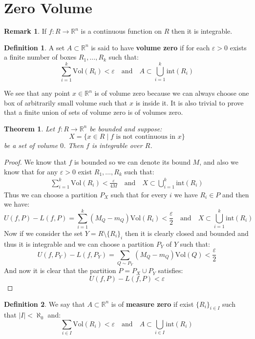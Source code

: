 \documentclass[11pt,a4paper]{article}
\theoremstyle{definition}
\newtheorem{definition}{Definition}[section]
\newtheorem{remark}{Remark}[section]
\theoremstyle{plain}
\newtheorem{theorem}{Theorem}[section]
\newcommand{\R}{\mathbb{R}}
\begin{document}
	\newpage
	
	\section{Zero Volume}
	\begin{remark}
		If $f \colon R \to \R^n$ is a continuous function on $R$
		then it is integrable.
	\end{remark}
	\begin{definition}
		A set $A \subset \R^n$ is said to have \textbf{volume zero}
		if for each $\varepsilon > 0$ exists a finite number of
		boxes $R_1,\dots,R_k$ such that:
		\[
			\sum_{i=1}^{k}{\mathrm{Vol}(R_i)} < \varepsilon
			\quad \text{and} \quad
			A \subset \bigcup_{i=1}^{k}{\text{int}(R_i)}
		\]
	\end{definition}
	We see that any point $x \in \R^n$ is of volume zero because
	we can always choose one box of arbitrarily small volume such that
	$x$ is inside it. It is also trivial to prove that a finite
	union of sets of volume zero is of volumes zero.
	\begin{theorem}
		Let $f \colon R \to \R^n$ be bounded and suppose:
		\[
			X = \{x \in R \mid \text{$f$ is not continuous in $x$}\}
		\]
		be a set of volume $0$. Then $f$ is integrable over $R$.
	\end{theorem}
	\begin{proof}
		We know that $f$ is bounded so we can denote its bound $M$,
		and also we know that for any $\varepsilon > 0 $ exist
		$R_1,\dots,R_k$ such that:
		\begin{align*}
			\sum_{i=1}^{k}{\mathrm{Vol}(R_i)} < \frac{\varepsilon}{4M}
			\quad \text{and} \quad
			X \subset \bigcup_{i=1}^{k}{\text{int}(R_i)}
		\end{align*}
		Thus we can choose a partition $P_X$ such that for every $i$
		we have $R_i \in P$ and then we have:
		\[
			U(f,P) - L(f,P) = 
			\sum_{i=1}^{k}{(M_Q-m_Q)\mathrm{Vol}(R_i)} < 
			\frac{\varepsilon}{2}
			\quad \text{and} \quad
			X \subset \bigcup_{i=1}^{k}{\text{int}(R_i)}
		\]
		Now if we consider the set $Y = R \setminus \{R_i\}_i$ then
		it is clearly closed and bounded and thus it is integrable
		and we can choose a partition $P_Y$ of $Y$ such that:
		\[
			U(f,P_Y) - L(f,P_Y) = 
			\sum_{Q \sim P_Y}{(M_Q-m_Q)\mathrm{Vol}(Q)} < 
			\frac{\varepsilon}{2}
		\]
		And now it is clear that the partition $P = P_X \cup P_Y$
		satisfies:
		\[
			U(f,P) - L(f,P) < \varepsilon
		\]
	\end{proof}
	\begin{definition}
		We say that $A \subset \R^n$ is of \textbf{measure zero} if
		exist $\{R_i\}_{i \in I}$ such that $|I| < \aleph_0$ and:
		\[
			\sum_{i \in I}{\mathrm{Vol}(R_i)} < \varepsilon
			\quad \text{and} \quad
			A \subset \bigcup_{i \in I}{\text{int}(R_i)}
		\]
	\end{definition}
\end{document}
